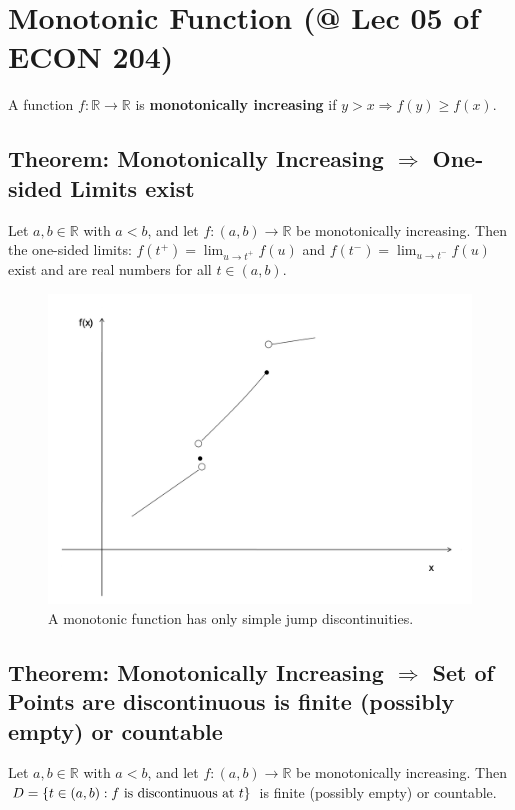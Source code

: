 \documentclass[11pt]{elegantbook}
\begin{document}
\section{Monotonic Function \small{(@ Lec 05 of ECON 204)}}
\begin{definition}
    \normalfont
    A function $f : \mathbb{R} \rightarrow  \mathbb{R}$ is \textbf{monotonically increasing} if $y>x \Rightarrow f(y)\geq f(x)$.
\end{definition}

\subsection{Theorem: Monotonically Increasing $\Rightarrow$ One-sided Limits exist}
\begin{theorem}
    Let $a, b \in \mathbb{R}$ with $a < b$, and let $f : (a, b) \rightarrow \mathbb{R}$ be monotonically increasing. Then the one-sided limits: $f(t^+)=\lim_{u \rightarrow t^+}f(u)$ and $f(t^-)=\lim_{u \rightarrow t^-}f(u)$ exist and are real numbers for all $t \in (a, b)$.
\end{theorem}
\begin{center}\begin{figure}[htbp]
    \centering
    \includegraphics[scale=0.2]{SJD.png}
    \caption{A monotonic function has only simple jump discontinuities.}
    \label{}
\end{figure}\end{center}

\subsection{Theorem: Monotonically Increasing $\Rightarrow$ Set of Points are discontinuous is finite (possibly empty) or countable}
\begin{theorem}
    Let $a, b \in \mathbb{R}$ with $a < b$, and let $f : (a, b) \rightarrow \mathbb{R}$ be monotonically increasing. Then $D=\{t\in(a,b): f \textnormal{ is discontinuous at }t\}$ is finite (possibly empty) or countable.
\end{theorem}
\end{document}

